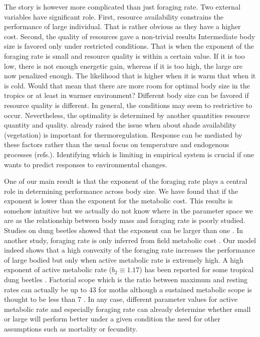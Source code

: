  The story is however more complicated than just foraging rate.
 Two external variables have significant role.
 First, resource availability constrains the performance of large individual.
 That is rather obvious as they have a higher cost.
 Second, the quality of resources gave a non-trivial results
 Intermediate body size is favored only under restricted conditions. 
 That is when the exponent of the foraging rate is small and resource quality is within a certain value.
 If it is too low, there is not enough energetic gain, whereas if it is too high, the large are now penalized enough.
 The likelihood that is higher when it is warm that when it is cold. 
 Would that mean that there are more room for optimal  body size in the tropics or at least in warmer environment?%
 Different body size can be favored if resource quality is different.
 In general, the conditions may seem to restrictive to occur.
 Nevertheless, the optimality is determined by another quantities resource quantity and quality.
 \citet{Kearney2009b} already raised the issue when about shade availability (vegetation) is important for thermoregulation.
  Response can be mediated by these factors  rather than the usual focus on temperature and endogenous processes (refs.).
 Identifying which is limiting in empirical system is crucial if one wants to predict responses to environmental changes.

One of our main result is that the exponent of the foraging rate plays a central role in determining performance across body size.
We have found that if the exponent is lower than the exponent for the metabolic cost.
This results is somehow intuitive but we actually do not know where in the parameter space we are as the relationship between body mass and foraging rate is poorly studied.
Studies on dung beetles showed that the exponent can be larger than one \citep{Nervo2014}.
In another study, foraging rate is only inferred from field metabolic cost \citep{Nagy1987}.
Our model indeed shows that a high convexity of the foraging rate increases the performance of large bodied but only when active metabolic rate is extremely high.
A high exponent of active metabolic rate ($b_2 \equiv 1.17$) has been reported for some tropical dung beetles \citep{Bartholomew1978}. 
Factorial scope which is the ratio between maximum and resting rates can actually be up to 43 for moths \citep{Bartholomew1981} although a sustained metabolic scope is thought to be less than 7 \citep{Petterson1990}.
In any case, different parameter values for active metabolic rate and especially foraging rate can already determine whether small or large will perform better under a given condition the need for other assumptions such as mortality or fecundity.


